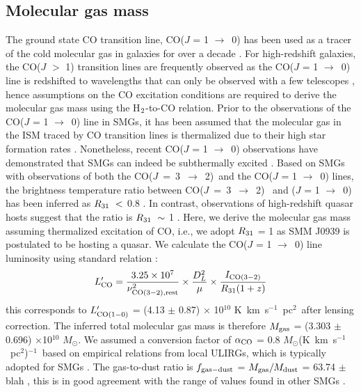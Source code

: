 \documentclass[twocolumn,apj,numberedappendix]{emulateapj}
\newcommand{\Msun}{\mbox{$M_{\odot}$}}
\newcommand{\rarr}{$\rightarrow$}
\newcommand{\CO}{\mbox{CO($J$ = 3 $\rightarrow$ 2) }}
\newcommand{\LpU}{\mbox{K km s$^{-1}$ pc$^2$}}
\newcommand{\eg}{{\sl e.g.,~}}
\newcommand{\pmOne}{$^{-1}$}
\begin{document}
\subsection{Molecular gas mass}
The ground state CO transition line, CO($J$ = 1 \rarr\ 0) has been used as a tracer of the cold molecular gas in galaxies for 
over a decade \citep*[\eg][]{Downes98a,Wilson70a}. For high-redshift galaxies, the CO($J$ $>$ 1) transition lines are frequently observed as
 the CO($J$ = 1 \rarr\ 0) line is redshifted to wavelengths that can only be observed with a few telescopes \citep{Carilli13a}, 
 hence assumptions on the CO excitation conditions are required to derive the molecular gas mass using the H$_{\rm 2}$-to-CO 
 relation. Prior to the observations of the CO($J$ = 1 \rarr\ 0) line in SMGs, it has been assumed that the molecular gas in the
  ISM traced by CO transition lines is thermalized due to their high star formation rates \citep[\eg][]{Greve05a, Coppin08a}.
   Nonetheless, recent CO($J$ = 1 \rarr\ 0) observations have demonstrated that SMGs can indeed be subthermally excited
   \citep{Bothwell13a, Harris10a}. Based on SMGs with observations of both the \CO and the CO($J$ = 1 \rarr\ 0) lines, the 
   brightness temperature ratio between \CO
and ($J$ = 1 \rarr\ 0) has been inferred as $R_{\rm 31}\ <$ 0.8 \citep
   {Harris10a,Carilli10a,Swinbank2010a,Ivison11a,Ivison10d}. In contrast, observations of high-redshift quasar hosts suggest that the ratio 
   is $R_{\rm 31}\ \sim\ $1 \citep{Riechers06a, Riechers11a, Scott11a}. 
Here, we derive the molecular gas mass assuming thermalized excitation of CO, i.e., we adopt $R_{\rm 31}$ = 1 as SMM J0939 is 
postulated to be hosting a quasar. We calculate the CO($J$ = 1 \rarr\ 0) line luminosity using standard relation 
\citep[\eg][]{Solomon05a,Carilli13a}:
\begin{equation}
L^{\prime}_{\rm CO} = \frac{3.25\times10^7}{\nu_{\rm CO (3-2), rest}^2}\times \frac{D_L^2}{\mu} \times
\frac{I_{\rm CO(3-2)}} {R_{\rm 31} (1 + z)}
\end{equation}
this corresponds to $L^{\prime}_{\rm CO (1-0)}$ = (4.13 $\pm$ 0.87) $\times$ 10$^{10}$ \LpU\ after lensing correction. The inferred total molecular gas mass is therefore $M_{\rm gas}$ = (3.303 $\pm$ 0.696) $\times
$10$^{10}$ \Msun. We assumed a conversion factor of $\alpha_{\rm CO}$ =
0.8 \Msun (\LpU)\pmOne\ based on empirical relations from local ULIRGs, which is typically
adopted for SMGs \citep[\eg][]{Tacconi10a,Bothwell13a}. 
The gas-to-dust
ratio is $f_{\rm gas-dust}$ = $M_{\rm gas}/M_{\rm dust}$ = 63.74 $\pm$ blah , this is in good agreement with the range 
of values found in other SMGs \citep{Coppin08a}.
\end{document}
